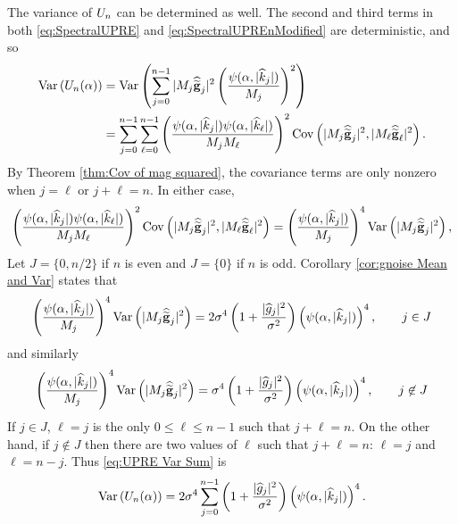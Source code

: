 The variance of $U_n$ can be determined as well. The second and third terms in both \eqref{eq:SpectralUPRE} and \eqref{eq:SpectralUPREnModified} are deterministic, and so
\begin{equation}
\label{eq:UPRE Var Sum}
\begin{split}
\operatorname{Var}\left(U_n(\alpha)\right) &= \operatorname{Var}\left(\sum_{j = 0}^{n-1} |M_j\widehat{\widetilde{\mathbf{g}}}_j|^2\left(\frac{\psi(\alpha,|\widehat{k}_j|)}{M_j}\right)^2\right) \\
&= \sum_{j=0}^{n-1} \sum_{\ell=0}^{n-1} \left(\frac{\psi(\alpha,|\widehat{k}_j|)\psi(\alpha,|\widehat{k}_\ell|)}{M_jM_\ell}\right)^2 \operatorname{Cov}\left(|M_j\widehat{\widetilde{\mathbf{g}}}_j|^2,|M_\ell\widehat{\widetilde{\mathbf{g}}}_\ell|^2\right).
\end{split}
\end{equation}
By Theorem \ref{thm:Cov of mag squared}, the covariance terms are only nonzero when $j = \ell$ or $j + \ell = n$. In either case,
\[\left(\frac{\psi(\alpha,|\widehat{k}_j|)\psi(\alpha,|\widehat{k}_\ell|)}{M_jM_\ell}\right)^2 \operatorname{Cov}\left(|M_j\widehat{\widetilde{\mathbf{g}}}_j|^2,|M_\ell\widehat{\widetilde{\mathbf{g}}}_\ell|^2\right) = \left(\frac{\psi(\alpha,|\widehat{k}_j|)}{M_j}\right)^4 \operatorname{Var}\left(|M_j\widehat{\widetilde{\mathbf{g}}}_j|^2\right),\]
Let $J = \{0,n/2\}$ if $n$ is even and $J = \{0\}$ if $n$ is odd. Corollary \ref{cor:gnoise Mean and Var} states that
\[\left(\frac{\psi(\alpha,|\widehat{k}_j|)}{M_j}\right)^4 \operatorname{Var}\left(|M_j\widehat{\widetilde{\mathbf{g}}}_j|^2\right) = 2\sigma^4\left(1 + \dfrac{|\widehat{g}_j|^2}{\sigma^2}\right)\left(\psi(\alpha,|\widehat{k}_j|)\right)^4, \qquad j \in J\]
and similarly
\[\left(\frac{\psi(\alpha,|\widehat{k}_j|)}{M_j}\right)^4 \operatorname{Var}\left(|M_j\widehat{\widetilde{\mathbf{g}}}_j|^2\right) = \sigma^4\left(1 + \dfrac{|\widehat{g}_j|^2}{\sigma^2}\right)\left(\psi(\alpha,|\widehat{k}_j|)\right)^4, \qquad j \not\in J\]
If $j \in J$, $\ell = j$ is the only $0 \leq \ell \leq n-1$ such that $j + \ell = n$. On the other hand, if $j \not\in J$ then there are two values of $\ell$ such that $j + \ell = n$: $\ell = j$ and $\ell = n - j$. Thus \eqref{eq:UPRE Var Sum} is
\begin{equation}
\label{eq:UPRE Var Sum Simple}
\operatorname{Var}\left(U_n(\alpha)\right) = 2\sigma^4\sum_{j=0}^{n-1} \left(1 + \dfrac{|\widehat{g}_j|^2}{\sigma^2}\right)\left(\psi(\alpha,|\widehat{k}_j|)\right)^4.
\end{equation}

